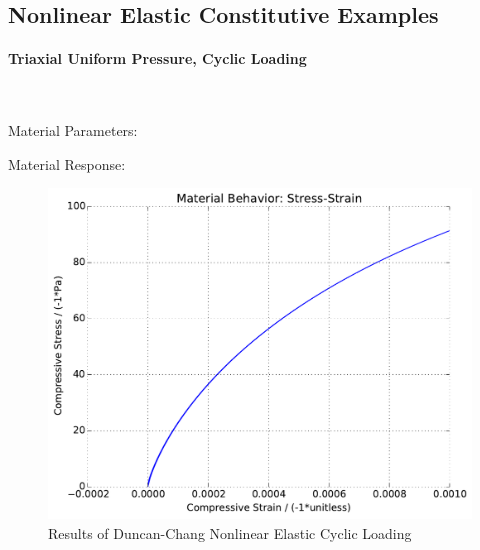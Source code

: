 \documentclass[fleqn,11pt]{article}
\begin{document}
\newpage
\subsection{Nonlinear Elastic Constitutive Examples}

\paragraph{Triaxial Uniform Pressure, Cyclic Loading} ~

Material Parameters:


Material Response:
\begin{figure}[H]
\begin{center}
\includegraphics[width=12cm]{../fei_examples/duncan_chang_nonlinear_elasticity/2triaxial_uniform_cyclic_loading/result.pdf}
\caption{
\label{Res_triaxial_nonlinear_elastic_cyclic}
Results of Duncan-Chang Nonlinear Elastic Cyclic Loading}
\end{center}
\end{figure}















\newpage
\end{document}
